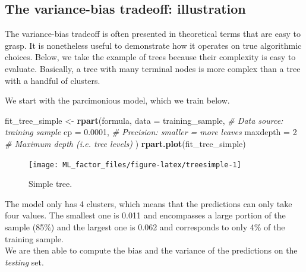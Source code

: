\documentclass[]{krantz}
\makeatletter
\newenvironment{Shaded}{\begin{snugshade}}{\end{snugshade}}
\newcommand{\CommentTok}[1]{\textcolor[rgb]{0.37,0.37,0.37}{\textit{#1}}}
\newcommand{\DataTypeTok}[1]{\textcolor[rgb]{0.27,0.27,0.27}{#1}}
\newcommand{\DecValTok}[1]{\textcolor[rgb]{0.06,0.06,0.06}{#1}}
\newcommand{\FloatTok}[1]{\textcolor[rgb]{0.06,0.06,0.06}{#1}}
\newcommand{\KeywordTok}[1]{\textcolor[rgb]{0.27,0.27,0.27}{\textbf{#1}}}
\newcommand{\NormalTok}[1]{#1}
\newcommand{\StringTok}[1]{\textcolor[rgb]{0.5,0.5,0.5}{#1}}
\newenvironment{kframe}{%
\medskip{}
\setlength{\fboxsep}{.8em}
 \def\at@end@of@kframe{}%
 \ifinner\ifhmode%
  \def\at@end@of@kframe{\end{minipage}}%
  \begin{minipage}{\columnwidth}%
 \fi\fi%
 \def\FrameCommand##1{\hskip\@totalleftmargin \hskip-\fboxsep
 \colorbox{shadecolor}{##1}\hskip-\fboxsep
     \hskip-\linewidth \hskip-\@totalleftmargin \hskip\columnwidth}%
 \MakeFramed {\advance\hsize-\width
   \@totalleftmargin\z@ \linewidth\hsize
   \@setminipage}}%
 {\par\unskip\endMakeFramed%
 \at@end@of@kframe}
\renewenvironment{Shaded}{\begin{kframe}}{\end{kframe}}
\theoremstyle{definition}
\theoremstyle{definition}
\theoremstyle{definition}
\theoremstyle{remark}
\makeatother
\begin{document}
\hypertarget{the-variance-bias-tradeoff-illustration}{%
\subsection{The variance-bias tradeoff:
illustration}\label{the-variance-bias-tradeoff-illustration}}

The variance-bias tradeoff is often presented in theoretical terms that
are easy to grasp. It is nonetheless useful to demonstrate how it
operates on true algorithmic choices. Below, we take the example of
trees because their complexity is easy to evaluate. Basically, a tree
with many terminal nodes is more complex than a tree with a handful of
clusters.

We start with the parcimonious model, which we train below.

\footnotesize

\begin{Shaded}
\begin{Highlighting}[]
\NormalTok{fit_tree_simple <-}\StringTok{ }\KeywordTok{rpart}\NormalTok{(formula, }
             \DataTypeTok{data =}\NormalTok{ training_sample,     }\CommentTok{# Data source: training sample}
             \DataTypeTok{cp =} \FloatTok{0.0001}\NormalTok{,                }\CommentTok{# Precision: smaller = more leaves}
             \DataTypeTok{maxdepth =} \DecValTok{2}                \CommentTok{# Maximum depth (i.e. tree levels)}
\NormalTok{             ) }
\KeywordTok{rpart.plot}\NormalTok{(fit_tree_simple)}
\end{Highlighting}
\end{Shaded}

\begin{figure}[H]

{\centering \texttt{[image: ML\_factor\_files/figure-latex/treesimple-1]} 

}

\caption{Simple tree.}\label{fig:treesimple}
\end{figure}

\normalsize

The model only has 4 clusters, which means that the predictions can only
take four values. The smallest one is 0.011 and encompasses a large
portion of the sample (85\%) and the largest one is 0.062 and
corresponds to only 4\% of the training sample.\\
We are then able to compute the bias and the variance of the predictions
on the \emph{testing} set.

\footnotesize
\end{document}
